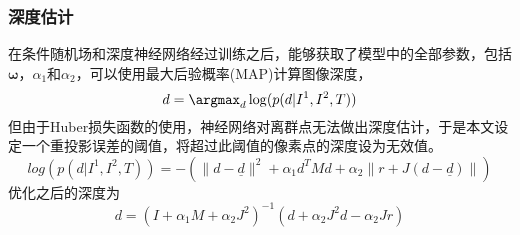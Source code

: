 \subsubsection{深度估计}
在条件随机场和深度神经网络经过训练之后，能够获取了模型中的全部参数，包括$\mathbf{\omega}$，$\alpha_1$和$\alpha_2$，可以使用最大后验概率(MAP)计算图像深度，
\begin{equation}
    d = \argmax_d \log(p(d|I^1,I^2,T))
\end{equation}
但由于Huber损失函数的使用，神经网络对离群点无法做出深度估计，于是本文设定一个重投影误差的阈值，将超过此阈值的像素点的深度设为无效值。
\begin{equation}
    log(p(d|I^1,I^2,T)) = -\left(\|d - \underline{d}\|^2 + \alpha_1d^TMd+\alpha_2\|r+J(d-\underline{d})\| \right)
\end{equation}
优化之后的深度为
\begin{equation}
    d = \left(I+\alpha_1M+\alpha_2J^2\right)^{-1}\left(d+\alpha_2J^2d-\alpha_2Jr\right)
    \label{eq:deepsr_depth_opti}
\end{equation}
